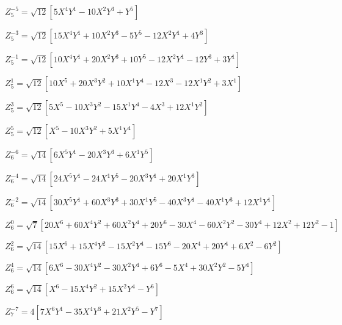 \documentclass[10pt,landscape]{article}
\begin{document}
\vspace{1.2 mm}
\noindent $ Z^{-5}_{5} = \sqrt{12} [5X^{4}Y^{1} -10X^{2}Y^{3} +Y^{5}] $

\vspace{1.2 mm}
\noindent $ Z^{-3}_{5} = \sqrt{12} [15X^{4}Y^{1} +10X^{2}Y^{3} -5Y^{5} -12X^{2}Y^{1} +4Y^{3}] $

\vspace{1.2 mm}
\noindent $ Z^{-1}_{5} = \sqrt{12} [10X^{4}Y^{1} +20X^{2}Y^{3} +10Y^{5} -12X^{2}Y^{1} -12Y^{3} +3Y^{1}] $

\vspace{1.2 mm}
\noindent $ Z^{1}_{5} = \sqrt{12} [10X^{5} +20X^{3}Y^{2} +10X^{1}Y^{4} -12X^{3} -12X^{1}Y^{2} +3X^{1}] $

\vspace{1.2 mm}
\noindent $ Z^{3}_{5} = \sqrt{12} [5X^{5} -10X^{3}Y^{2} -15X^{1}Y^{4} -4X^{3} +12X^{1}Y^{2}] $

\vspace{1.2 mm}
\noindent $ Z^{5}_{5} = \sqrt{12} [X^{5} -10X^{3}Y^{2} +5X^{1}Y^{4}] $

\vspace{1.2 mm}
\noindent $ Z^{-6}_{6} = \sqrt{14} [6X^{5}Y^{1} -20X^{3}Y^{3} +6X^{1}Y^{5}] $

\vspace{1.2 mm}
\noindent $ Z^{-4}_{6} = \sqrt{14} [24X^{5}Y^{1} -24X^{1}Y^{5} -20X^{3}Y^{1} +20X^{1}Y^{3}] $

\vspace{1.2 mm}
\noindent $ Z^{-2}_{6} = \sqrt{14} [30X^{5}Y^{1} +60X^{3}Y^{3} +30X^{1}Y^{5} -40X^{3}Y^{1} -40X^{1}Y^{3} +12X^{1}Y^{1}] $

\vspace{1.2 mm}
\noindent $ Z^{0}_{6} = \sqrt{7} [20X^{6} +60X^{4}Y^{2} +60X^{2}Y^{4} +20Y^{6} -30X^{4} -60X^{2}Y^{2} -30Y^{4} +12X^{2} +12Y^{2} -1] $

\vspace{1.2 mm}
\noindent $ Z^{2}_{6} = \sqrt{14} [15X^{6} +15X^{4}Y^{2} -15X^{2}Y^{4} -15Y^{6} -20X^{4} +20Y^{4} +6X^{2} -6Y^{2}] $

\vspace{1.2 mm}
\noindent $ Z^{4}_{6} = \sqrt{14} [6X^{6} -30X^{4}Y^{2} -30X^{2}Y^{4} +6Y^{6} -5X^{4} +30X^{2}Y^{2} -5Y^{4}] $

\vspace{1.2 mm}
\noindent $ Z^{6}_{6} = \sqrt{14} [X^{6} -15X^{4}Y^{2} +15X^{2}Y^{4} -Y^{6}] $

\vspace{1.2 mm}
\noindent $ Z^{-7}_{7} = 4 [7X^{6}Y^{1} -35X^{4}Y^{3} +21X^{2}Y^{5} -Y^{7}] $
\end{document}
